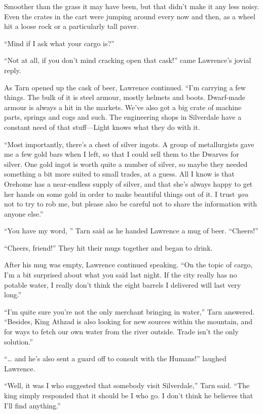 Smoother than the grass it may have been, but that didn't make it any less noisy.  Even the crates in the cart were jumping around every now and then, as a wheel hit a loose rock or a particularly tall paver.

``Mind if I ask what your cargo is?''

``Not at all, if you don't mind cracking open that cask!'' came Lawrence's jovial reply.

As Tarn opened up the cask of beer, Lawrence continued.  ``I'm carrying a few things.  The bulk of it is steel armour, mostly helmets and boots.  Dwarf-made armour is always a hit in the markets.  We've also got a big crate of machine parts, springs and cogs and such.  The engineering shops in Silverdale have a constant need of that stuff---Light knows what they do with it.

``Most importantly, there's a chest of silver ingots.  A group of metallurgists gave me a few gold bars when I left, so that I could sell them to the Dwarves for silver.  One gold ingot is worth quite a number of silver, so maybe they needed something a bit more suited to small trades, at a guess.  All I know is that Orehome has a near-endless supply of silver, and that she's always happy to get her hands on some gold in order to make beautiful things out of it.  I trust \emph{you} not to try to rob me, but please also be careful not to share the information with anyone else.''

``You have my word, '' Tarn said as he handed Lawrence a mug of beer.  ``Cheers!''

``Cheers, friend!''  They hit their mugs together and began to drink.

After his mug was empty, Lawrence continued speaking.  ``On the topic of cargo, I'm a bit surprised about what you said last night.  If the city really has no potable water, I really don't think the eight barrels I delivered will last very long.''

``I'm quite sure you're not the only merchant bringing in water,'' Tarn answered.  ``Besides, King Athzad is also looking for new sources within the mountain, and for ways to fetch our own water from the river outside.  Trade isn't the only solution.''

``\ldots{} and he's also sent a guard off to consult with the Humans!'' laughed Lawrence.

``Well, it was I who suggested that somebody visit Silverdale,'' Tarn said.  ``The king simply responded that it should be I who go.  I don't think he believes that I'll find anything.''

